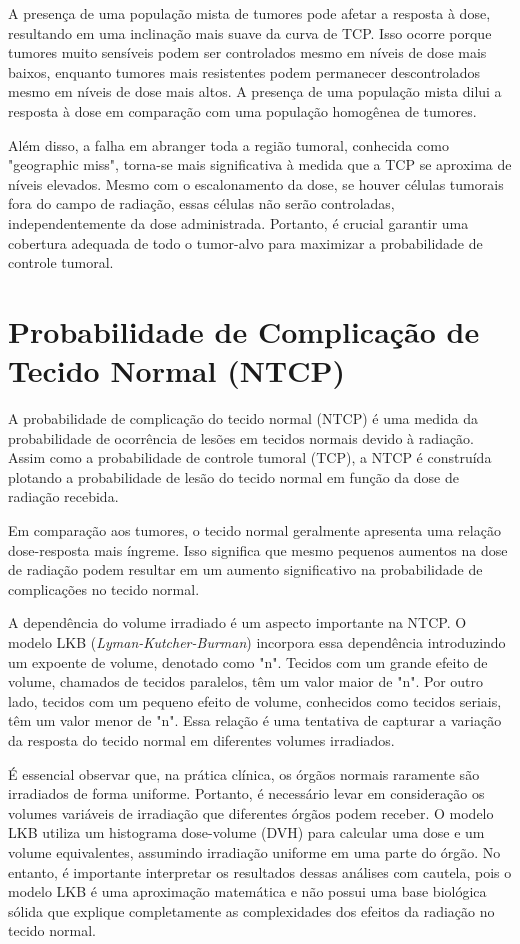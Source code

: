\documentclass[11pt,a4paper]{article}
\begin{document}
	A presença de uma população mista de tumores pode afetar a resposta à dose, resultando em uma inclinação mais suave da curva de TCP. Isso ocorre porque tumores muito sensíveis podem ser controlados mesmo em níveis de dose mais baixos, enquanto tumores mais resistentes podem permanecer descontrolados mesmo em níveis de dose mais altos. A presença de uma população mista dilui a resposta à dose em comparação com uma população homogênea de tumores.

	Além disso, a falha em abranger toda a região tumoral, conhecida como "geographic miss", torna-se mais significativa à medida que a TCP se aproxima de níveis elevados. Mesmo com o escalonamento da dose, se houver células tumorais fora do campo de radiação, essas células não serão controladas, independentemente da dose administrada. Portanto, é crucial garantir uma cobertura adequada de todo o tumor-alvo para maximizar a probabilidade de controle tumoral.

\section{Probabilidade de Complicação de Tecido Normal (NTCP)}


	A probabilidade de complicação do tecido normal (NTCP) é uma medida da probabilidade de ocorrência de lesões em tecidos normais devido à radiação. Assim como a probabilidade de controle tumoral (TCP), a NTCP é construída plotando a probabilidade de lesão do tecido normal em função da dose de radiação recebida.

	Em comparação aos tumores, o tecido normal geralmente apresenta uma relação dose-resposta mais íngreme. Isso significa que mesmo pequenos aumentos na dose de radiação podem resultar em um aumento significativo na probabilidade de complicações no tecido normal.

	A dependência do volume irradiado é um aspecto importante na NTCP. O modelo LKB (\textit{Lyman-Kutcher-Burman}) incorpora essa dependência introduzindo um expoente de volume, denotado como "n". Tecidos com um grande efeito de volume, chamados de tecidos paralelos, têm um valor maior de "n". Por outro lado, tecidos com um pequeno efeito de volume, conhecidos como tecidos seriais, têm um valor menor de "n". Essa relação é uma tentativa de capturar a variação da resposta do tecido normal em diferentes volumes irradiados.

	É essencial observar que, na prática clínica, os órgãos normais raramente são irradiados de forma uniforme. Portanto, é necessário levar em consideração os volumes variáveis de irradiação que diferentes órgãos podem receber. O modelo LKB utiliza um histograma dose-volume (DVH) para calcular uma dose e um volume equivalentes, assumindo irradiação uniforme em uma parte do órgão. No entanto, é importante interpretar os resultados dessas análises com cautela, pois o modelo LKB é uma aproximação matemática e não possui uma base biológica sólida que explique completamente as complexidades dos efeitos da radiação no tecido normal.
\end{document}

